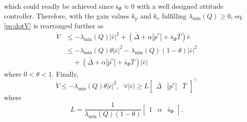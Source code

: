 \documentclass[letterpaper, 10 pt, conference]{ieeeconf}  %
\begin{document}
which could readly be achieved since $\bar{\text{s}}_\Phi \approx 0$ with a well designed attitude controller.
Therefore, with the gain values $k_p$ and $k_v$ fulfilling $\lambda_{\min}(Q) \geq 0$, eq. \eqref{eq:dotV} is rearranged further as
\begin{align}
\dot{V} &\leq -\lambda_{\min}(Q)|\bar{e}|^2 + (\bar{\Delta}+\alpha|\dot{p}^r|+\bar{s}_\Phi\bar{T})\bar{e} \nonumber \\
&\leq -\lambda_{\min}(Q)\theta|\bar{e}|^2-\lambda_{\min}(Q)(1-\theta)|\bar{e}|^2 \nonumber \\
&\;\;\;\;+ (\bar{\Delta}+\alpha|\dot{p}^r|+\bar{s}_\Phi\bar{T})|\bar{e}| \nonumber
\end{align}
where $0<\theta<1$. Finally, 
\begin{equation}
\dot{V} \leq -\lambda_{\min}(Q)\theta|\bar{e}|^2,\;\;\forall|\bar{e}| \geq L\left[
\begin{array}{ccc}
\bar{\Delta}&|\dot{p}^r|&\bar{T}
\end{array}
\right]^\top
\end{equation}
where
\begin{equation}
L = \frac{1}{\lambda_{\min}(Q)(1-\theta)}\left[
\begin{array}{ccc}
1&\alpha&\bar{\text{s}}_\Phi 
\end{array}
\right].
\end{equation}
\end{document}
